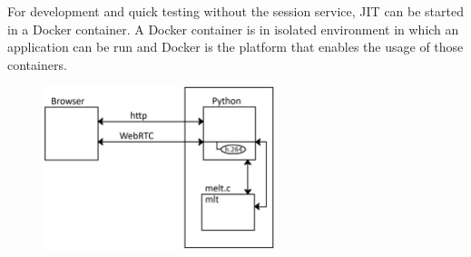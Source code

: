 \documentclass[12pt,a4paper]{article}
\begin{document}
For development and quick testing without the session service, JIT can be started in a Docker container. A Docker container is in isolated environment in which an application can be run and Docker is the platform that enables the usage of those containers.~\cite{docker}


\begin{figure}[H]
	\centering
	\includegraphics[width=0.6\textwidth]{IM2.png}
\end{figure}


%
%
%
%
%
%
%
%
%
%
%
%
%
%
%
\end{document}

